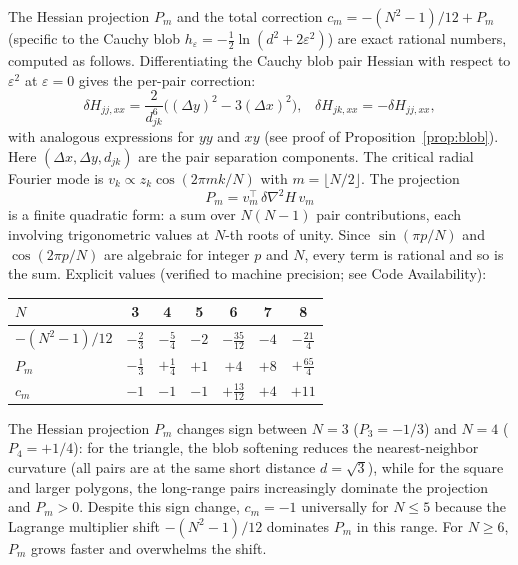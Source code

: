 The Hessian projection $P_m$ and the total correction
$c_m = -(N^2{-}1)/12 + P_m$ (specific to the Cauchy blob
$h_\varepsilon = -\tfrac12\ln(d^2 + 2\varepsilon^2)$) are exact
rational numbers, computed as follows.  Differentiating the Cauchy
blob pair Hessian with respect to $\varepsilon^2$ at $\varepsilon=0$
gives the per-pair correction:
\begin{equation}\label{eq:blob_pair_correction}
  \delta H_{jj,xx} = \frac{2}{d_{jk}^6}\bigl((\Delta y)^2 - 3(\Delta x)^2\bigr),
  \;\;\;
  \delta H_{jk,xx} = -\delta H_{jj,xx},
\end{equation}
with analogous expressions for $yy$ and $xy$ (see proof of
Proposition~\ref{prop:blob}).  Here $(\Delta x, \Delta y, d_{jk})$
are the pair separation components.  The critical radial Fourier
mode is $v_k \propto z_k\cos(2\pi mk/N)$ with $m = \lfloor N/2\rfloor$.
The projection
\begin{equation}\label{eq:Pm_formula}
  P_m = v_m^\top\,\delta\nabla^2\!H\,v_m
\end{equation}
is a finite quadratic form: a sum over $N(N{-}1)$ pair
contributions, each involving trigonometric values at $N$-th roots
of unity.  Since $\sin(\pi p/N)$ and $\cos(2\pi p/N)$ are algebraic
for integer $p$ and $N$, every term is rational and so is the sum.
Explicit values (verified to machine precision;
see Code Availability):
\begin{center}
\begin{tabular}{lcccccc}
\toprule
$N$ & 3 & 4 & 5 & 6 & 7 & 8 \\
\midrule
$-(N^2{-}1)/12$ & $-\frac23$ & $-\frac54$ & $-2$ &
  $-\frac{35}{12}$ & $-4$ & $-\frac{21}{4}$ \\[3pt]
$P_m$ & $-\frac13$ & $+\frac14$ & $+1$ & $+4$ & $+8$ &
  $+\frac{65}{4}$ \\[3pt]
$c_m$ & $-1$ & $-1$ & $-1$ & $+\frac{13}{12}$ & $+4$ & $+11$ \\
\bottomrule
\end{tabular}
\end{center}

\noindent
The Hessian projection $P_m$ changes sign between $N = 3$
($P_3 = -1/3$) and $N = 4$ ($P_4 = +1/4$): for the triangle, the blob
softening reduces the nearest-neighbor curvature (all pairs are at the
same short distance $d = \sqrt{3}$), while for the square and larger
polygons, the long-range pairs increasingly dominate the projection
and $P_m > 0$.  Despite this sign change,
$c_m = -1$ universally for $N \le 5$ because the Lagrange multiplier
shift $-(N^2{-}1)/12$ dominates $P_m$ in this range.  For $N \ge 6$,
$P_m$ grows faster and overwhelms the shift.

